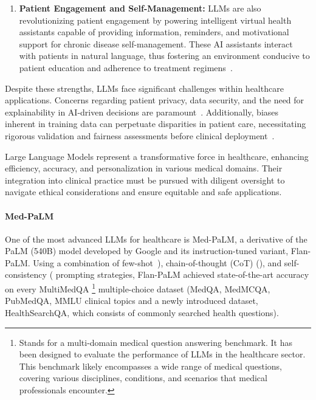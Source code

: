 \begin{enumerate}
	\item \textbf{Patient Engagement and Self-Management:}{
		      LLMs are also revolutionizing patient engagement by powering intelligent virtual health assistants capable of providing information, reminders, and motivational support for chronic disease self-management. These AI assistants interact with patients in natural language, thus fostering an environment conducive to patient education and adherence to treatment regimens~\cite{kocaballi2019personalization}.
	      }
\end{enumerate}

Despite these strengths, LLMs face significant challenges within healthcare applications.
Concerns regarding patient privacy, data security, and the need for explainability in AI-driven decisions are paramount~\cite{beam2018big}.
Additionally, biases inherent in training data can perpetuate disparities in patient care, necessitating rigorous validation and fairness assessments before clinical deployment~\cite{chen2019single}.

Large Language Models represent a transformative force in healthcare, enhancing efficiency, accuracy, and personalization in various medical domains.
Their integration into clinical practice must be pursued with diligent oversight to navigate ethical considerations and ensure equitable and safe applications.

\paragraph{Med-PaLM}
\label{par:med-palm}

One of the most advanced LLMs for healthcare is Med-PaLM, a derivative of the PaLM (540B) model developed by Google and its instruction-tuned variant, Flan-PaLM. Using a combination of few-shot~\cite{brown2020language}), chain-of-thought (CoT) (\textcite{wei2022chain}), and self-consistency (\textcite{wang2022self} prompting strategies, Flan-PaLM achieved state-of-the-art accuracy on every MultiMedQA \footnote{Stands for a multi-domain medical question answering benchmark. It has been designed to evaluate the performance of LLMs in the healthcare sector.
	This benchmark likely encompasses a wide range of medical questions, covering various disciplines, conditions, and scenarios that medical professionals encounter.} multiple-choice dataset (MedQA, MedMCQA, PubMedQA, MMLU clinical topics and a newly introduced dataset, HealthSearchQA, which consists of commonly searched health questions).

